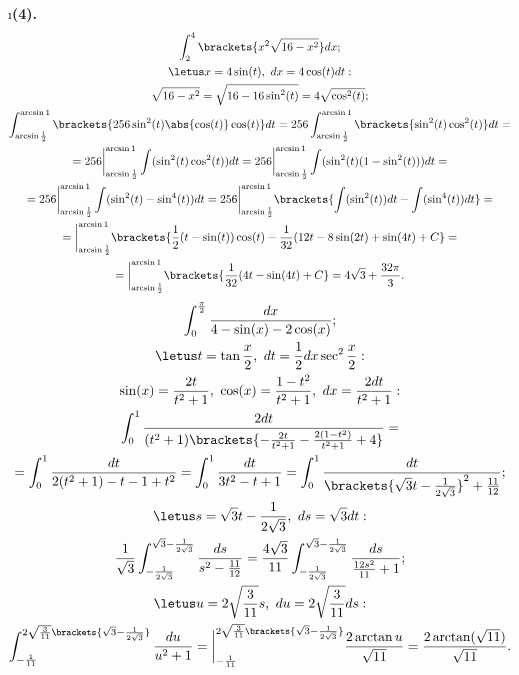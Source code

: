 \i \textbf{(4).}\\
\pu
\begin{gather*}
    \int_2^4 \brackets{x^2\sqrt{16-x^2}}dx;\\
    \letus x = 4\sin(t),\ dx = 4\cos(t)dt:\\
    \sqrt{16-x^2} = \sqrt{16 - 16\sin^2(t)} = 4\sqrt{\cos^2(t)};\\
    \int_{\arcsin{\frac{1}{2}}}^{\arcsin{1}}\brackets{256\sin^2(t)\abs{\cos(t)}\cos(t)}dt = 256\int_{\arcsin{\frac{1}{2}}}^{\arcsin{1}}\brackets{\sin^2(t)\cos^2(t)}dt = \\ = 
    256 \bigg|_{\arcsin{\frac{1}{2}}}^{\arcsin{1}} \int(\sin^2(t)\cos^2(t))dt = 256 \bigg|_{\arcsin{\frac{1}{2}}}^{\arcsin{1}} \int(\sin^2(t)(1 - \sin^2(t)))dt = \\ = 
    256 \bigg|_{\arcsin{\frac{1}{2}}}^{\arcsin{1}} \int(\sin^2(t) - \sin^4(t))dt = 256 \bigg|_{\arcsin{\frac{1}{2}}}^{\arcsin{1}} \brackets{\int(\sin^2(t))dt - \int(\sin^4(t))dt} = \\ = \bigg|_{\arcsin{\frac{1}{2}}}^{\arcsin{1}} \brackets{\frac{1}{2}(t - \sin(t))\cos(t) - \frac{1}{32}(12t - 8\sin(2t) + \sin(4t) + C} = \\ = 
    \bigg|_{\arcsin{\frac{1}{2}}}^{\arcsin{1}} \brackets{\frac{1}{32}(4t - \sin(4t) + C} = 4\sqrt{3} + \frac{32\pi}{3}.
\end{gather*}
\pu 
\begin{gather*}
    \int_0^{\frac{\pi}{2}}\frac{dx}{4 - \sin(x) - 2\cos(x)};\\
    \letus t = \tan{\frac{x}{2}},\ dt = \frac{1}{2}dx\sec^2\frac{x}{2}:\\
    \sin(x) = \frac{2t}{t^2 + 1},\ \cos(x) = \frac{1 - t^2}{t^2 + 1},\ dx = \frac{2dt}{t^2 + 1}:\\
    \int_0^1\frac{2dt}{(t^2 + 1)\brackets{-\frac{2t}{t^2 + 1} - \frac{2(1 - t^2)}{t^2 + 1} + 4}} = \\ = 
    \int_0^1\frac{dt}{2(t^2 + 1) - t - 1 + t^2} = \int_0^1\frac{dt}{3t^2 - t + 1} = \int_0^1\frac{dt}{\brackets{\sqrt{3}t - \frac{1}{2\sqrt{3}}}^2 + \frac{11}{12}};\\
    \letus s = \sqrt{3}t - \frac{1}{2\sqrt{3}},\ ds = \sqrt{3}dt:\\
    \frac{1}{\sqrt{3}}\int_{-\frac{1}{2\sqrt{3}}}^{\sqrt{3} - \frac{1}{2\sqrt{3}}} \frac{ds}{s^2 -\frac{11}{12}} = \frac{4\sqrt{3}}{11}\int_{-\frac{1}{2\sqrt{3}}}^{\sqrt{3} - \frac{1}{2\sqrt{3}}} \frac{ds}{\frac{12s^2}{11} + 1};\\
    \letus u = 2\sqrt{\frac{3}{11}}s,\ du = 2\sqrt{\frac{3}{11}}ds:\\
    \int_{-\frac{1}{11}}^{2\sqrt{\frac{3}{11}}\brackets{\sqrt{3} - \frac{1}{2\sqrt{3}}}} \frac{du}{u^2 + 1} = \bigg|_{-\frac{1}{11}}^{2\sqrt{\frac{3}{11}}\brackets{\sqrt{3} - \frac{1}{2\sqrt{3}}}} \frac{2\arctan{u}}{\sqrt{11}} = \frac{2\arctan(\sqrt{11})}{\sqrt{11}}.
\end{gather*}

